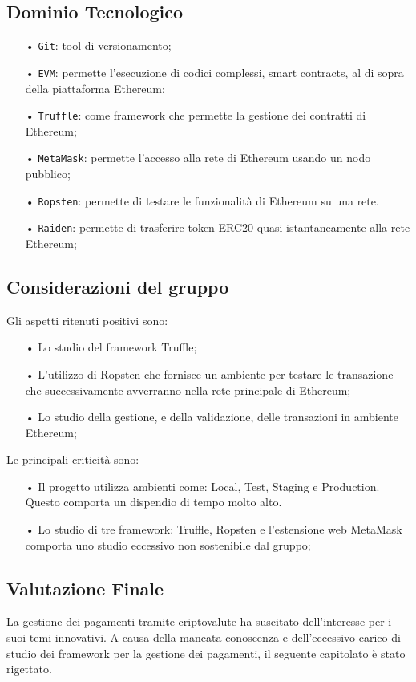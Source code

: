 \subsection{Dominio Tecnologico}
\begin{itemize}

\item[•] \texttt{Git}: tool di versionamento;
\item[•] \texttt{EVM}: permette l’esecuzione di codici complessi, smart contracts, al di sopra della piattaforma Ethereum;
\item[•] \texttt{Truffle}: come framework che permette la gestione dei contratti di Ethereum;
\item[•] \texttt{MetaMask}: 
permette l'accesso alla rete di Ethereum usando un nodo pubblico; 
\item[•] \texttt{Ropsten}: permette di testare le funzionalità di Ethereum su una rete. 
\item[•] \texttt{Raiden}: permette di trasferire token ERC20 quasi istantaneamente alla rete Ethereum;  

\end{itemize}

\subsection{Considerazioni del gruppo}

Gli aspetti ritenuti positivi sono: 
\begin{itemize}

\item[•] Lo studio del framework Truffle;
\item[•] L'utilizzo di Ropsten che fornisce un ambiente per testare le transazione che successivamente avverranno nella rete principale di Ethereum;
\item[•] Lo studio della gestione, e della validazione, delle transazioni in ambiente Ethereum; 
\newline
\end{itemize}



Le principali criticità sono: 
\begin{itemize}

\item[•] Il progetto utilizza ambienti come: Local, Test, Staging e Production. Questo comporta un dispendio di tempo molto alto. 

\item[•] Lo studio di tre framework: Truffle, Ropsten e l'estensione web MetaMask comporta uno studio eccessivo non sostenibile dal gruppo;

\end{itemize}


\subsection{Valutazione Finale}
La gestione dei pagamenti tramite criptovalute ha suscitato dell'interesse per i suoi temi innovativi. 
A causa della mancata conoscenza e dell'eccessivo carico di studio dei framework per la gestione dei pagamenti, il seguente capitolato è stato rigettato. 